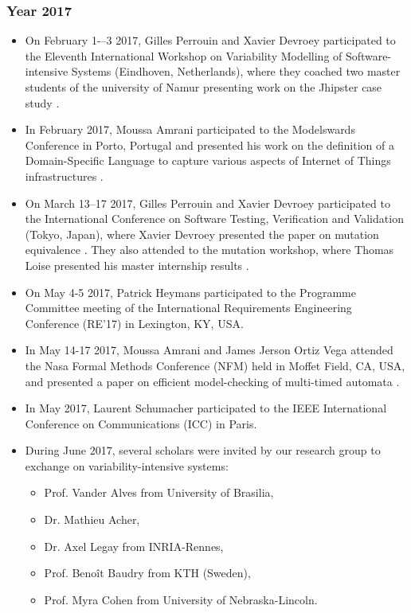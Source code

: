 \subsubsection{Year 2017}
\label{sec:2017}

\begin{itemize}
	\item On February 1-–3 2017, Gilles Perrouin and Xavier Devroey participated 
   to the Eleventh International Workshop on Variability Modelling of 
Software-intensive Systems (Eindhoven, Netherlands), where they coached two 
master students of the university of Namur presenting work on the Jhipster case 
study \cite{Halin17}.
    
   \item In February 2017, Moussa Amrani participated to the Modelswards 
Conference in Porto, Portugal and presented his work on the definition of a 
Domain-Specific Language to capture various aspects of Internet of Things 
infrastructures \cite{Amrani-Gilson-Debieche-Englebert:2017}.
    
	\item On March 13--17 2017, Gilles Perrouin and Xavier Devroey participated 
to the International Conference on Software Testing, Verification and 
Validation (Tokyo, Japan), where Xavier Devroey presented the paper on mutation 
equivalence \cite{DBLP:conf/icst/DevroeyPPLSH17}. They also attended to the 
mutation workshop, where Thomas Loise presented his master internship results 
\cite{DBLP:conf/icst/LoiseDPPH17}.
    
   \item On May 4-5 2017, Patrick Heymans participated to the Programme 
Committee meeting of the International Requirements Engineering Conference 
(RE'17) in Lexington, KY, USA.
    
   \item In May 14-17 2017, Moussa Amrani and James Jerson Ortiz Vega 
attended the Nasa Formal Methods Conference (NFM) held in Moffet Field, CA, 
USA, and presented a paper on efficient model-checking of multi-timed automata 
\cite{Ortiz-Amrani-Schobbens:2017}.
   
   \item In May 2017, Laurent Schumacher participated to the IEEE International 
Conference on Communications (ICC) in Paris.
   
   \item During June 2017, several scholars were invited by our research group 
to exchange on variability-intensive systems:
    \begin{itemize}
    \item Prof. Vander Alves from University of Brasilia,
    \item Dr. Mathieu Acher,
    \item Dr. Axel Legay from INRIA-Rennes,
    \item Prof. Benoît Baudry from KTH (Sweden),
    \item Prof. Myra Cohen from University of Nebraska-Lincoln.
	\end{itemize}
   

\end{itemize}
